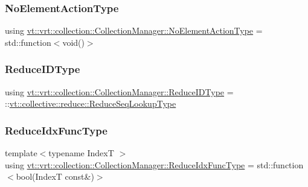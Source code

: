 \subsubsection{\texorpdfstring{No\+Element\+Action\+Type}{NoElementActionType}}
{\footnotesize\ttfamily using \hyperlink{structvt_1_1vrt_1_1collection_1_1_collection_manager_a6b9b76aadc721cec45d3e0e02d849ff1}{vt\+::vrt\+::collection\+::\+Collection\+Manager\+::\+No\+Element\+Action\+Type} =  std\+::function$<$void()$>$}

\mbox{\label{structvt_1_1vrt_1_1collection_1_1_collection_manager_aee9026deff88fc91bf48c0a05f5bd86b}} 
\subsubsection{\texorpdfstring{Reduce\+I\+D\+Type}{ReduceIDType}}
{\footnotesize\ttfamily using \hyperlink{structvt_1_1vrt_1_1collection_1_1_collection_manager_aee9026deff88fc91bf48c0a05f5bd86b}{vt\+::vrt\+::collection\+::\+Collection\+Manager\+::\+Reduce\+I\+D\+Type} =  \+::\hyperlink{namespacevt_1_1collective_1_1reduce_a3e69dddbbc89a0c9e9b986c5642efeba}{vt\+::collective\+::reduce\+::\+Reduce\+Seq\+Lookup\+Type}}

\mbox{\label{structvt_1_1vrt_1_1collection_1_1_collection_manager_a47a3227ae0195c15187e8dc8762f66c4}} 
\subsubsection{\texorpdfstring{Reduce\+Idx\+Func\+Type}{ReduceIdxFuncType}}
{\footnotesize\ttfamily template$<$typename IndexT $>$ \\
using \hyperlink{structvt_1_1vrt_1_1collection_1_1_collection_manager_a47a3227ae0195c15187e8dc8762f66c4}{vt\+::vrt\+::collection\+::\+Collection\+Manager\+::\+Reduce\+Idx\+Func\+Type} =  std\+::function$<$bool(IndexT const\&)$>$}

